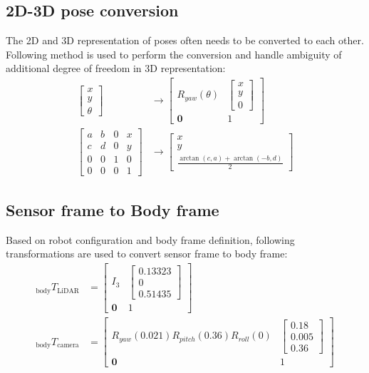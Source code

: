 \documentclass[conference]{IEEEtran}
\begin{document}
\subsection{2D-3D pose conversion}
The 2D and 3D representation of poses often needs to be converted to each other.
Following method is used to perform the conversion and handle
ambiguity of additional degree of freedom in 3D representation:
$$
\begin{aligned}
    \left[ \begin{gathered}x\\ y\\ \theta \end{gathered} \right]  
        &\rightarrow \left[ \begin{matrix}R_{yaw}(\theta )&\left[ \begin{gathered}x\\ y\\ 0\end{gathered} \right]  \\ \mathbf{0}&1\end{matrix} \right] \\
    \left[ \begin{matrix}a&b&0&x\\ c&d&0&y\\ 0&0&1&0\\ 0&0&0&1\end{matrix} \right]  
        &\rightarrow \left[ \begin{gathered}x\\ y\\ \frac{\arctan (c,a)+\arctan (-b,d)}{2} \end{gathered} \right]
\end{aligned} 
$$


\subsection{Sensor frame to Body frame}
Based on robot configuration and body frame definition, 
following transformations are used to convert sensor frame to body frame:
$$
\begin{aligned}
    {}_{\text{body} }T_{\text{LiDAR} }
        &=\left[ \begin{matrix}I_{3}&\left[ \begin{gathered}0.13323\\ 0\\ 0.51435\end{gathered} \right]  \\ \mathbf{0}&1\end{matrix} \right]  \\ 
    {}_{\text{body} }T_{\text{camera} }
        &=\left[ \begin{matrix}R_{yaw}\left( 0.021\right)  R_{pitch}\left( 0.36\right)  R_{roll}\left( 0\right)  &\left[ \begin{gathered}0.18\\ 0.005\\ 0.36\end{gathered} \right]  \\ \mathbf{0}&1\end{matrix} \right]  
\end{aligned} 
$$
\end{document}
